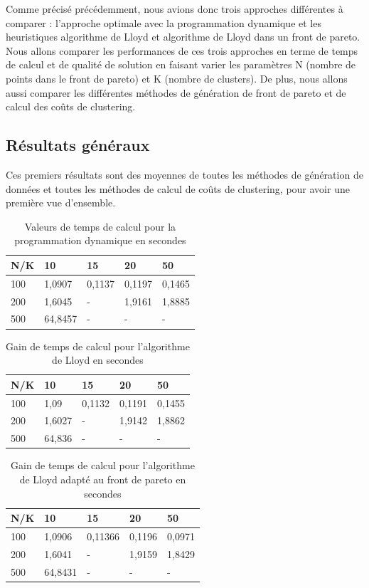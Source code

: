 ﻿\documentclass{meta}
\begin{document}
{Comme précisé précédemment, nous avions donc trois approches différentes à comparer : l'approche optimale avec la programmation dynamique et les heuristiques algorithme de Lloyd et algorithme de Lloyd dans un front de pareto. Nous allons comparer les performances de ces trois approches en terme de temps de calcul et de qualité de solution en faisant varier les paramètres N (nombre de points dans le front de pareto) et K (nombre de clusters). De plus, nous allons aussi comparer les différentes méthodes de génération de front de pareto et de calcul des coûts de clustering.

\subsection{Résultats généraux}
Ces premiers résultats sont des moyennes de toutes les méthodes de génération de données et toutes les méthodes de calcul de coûts de clustering, pour avoir une première vue d'ensemble.\\

\begin{table}[]
\centering
\begin{tabular}{|l|l|l|l|l|}
\hline
N/K & 10      & 15     & 20     & 50     \\ \hline
100 & 1,0907  & 0,1137 & 0,1197 & 0,1465 \\ \hline
200 & 1,6045  & -      & 1,9161 & 1,8885 \\ \hline
500 & 64,8457 & -      & -      & -      \\ \hline
\end{tabular}
\caption{Valeurs de temps de calcul pour la programmation dynamique en secondes}
\label{tab:my-table}
\end{table}

\begin{table}[]
\centering
\begin{tabular}{|l|l|l|l|l|}
\hline
N/K & 10     & 15     & 20     & 50     \\ \hline
100 & 1,09   & 0,1132 & 0,1191 & 0,1455 \\ \hline
200 & 1,6027 & -      & 1,9142 & 1,8862 \\ \hline
500 & 64,836 & -      & -      & -      \\ \hline
\end{tabular}
\caption{Gain de temps de calcul pour l'algorithme de Lloyd en secondes}
\label{tab:my-table}
\end{table}

\begin{table}[]
\centering
\begin{tabular}{|l|l|l|l|l|}
\hline
N/K & 10      & 15      & 20     & 50     \\ \hline
100 & 1,0906  & 0,11366 & 0,1196 & 0,0971 \\ \hline
200 & 1,6041  & -       & 1,9159 & 1,8429 \\ \hline
500 & 64,8431 & -       & -      & -      \\ \hline
\end{tabular}
\caption{Gain de temps de calcul pour l'algorithme de Lloyd adapté au front de pareto en secondes}
\label{tab:my-table}
\end{table}

}
\end{document}
